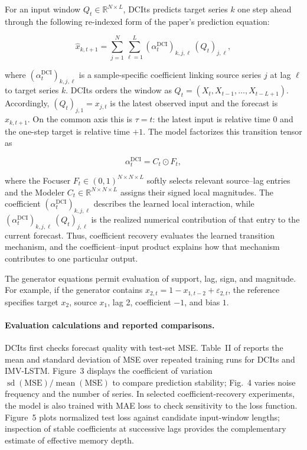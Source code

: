 For an input window $Q_t\in\mathbb{R}^{N\times L}$, DCIts predicts target series
$k$ one step ahead through the following re-indexed form of the paper's
prediction equation:

\begin{equation}
    \widehat{x}_{k,t+1}
    = \sum_{j=1}^{N}\sum_{\ell=1}^{L}
    (\alpha^{\mathrm{DCI}}_t)_{k,j,\ell}\,(Q_t)_{j,\ell},
\end{equation}

where $(\alpha^{\mathrm{DCI}}_t)_{k,j,\ell}$ is a sample-specific coefficient
linking source series $j$ at lag $\ell$ to target series $k$. DCIts orders the
window as $Q_t=(X_t,X_{t-1},\ldots,X_{t-L+1})$. Accordingly,
$(Q_t)_{j,1}=x_{j,t}$ is the latest observed input and the forecast is
$x_{k,t+1}$. On the common axis this is $\tau=t$: the latest input is relative
time 0 and the one-step target is relative time $+1$. The model factorizes
this transition tensor as

\begin{equation}
    \alpha^{\mathrm{DCI}}_t = C_t \odot F_t,
\end{equation}

where the Focuser $F_t\in(0,1)^{N\times N\times L}$ softly selects relevant
source--lag entries and the Modeler $C_t\in\mathbb{R}^{N\times N\times L}$
assigns their signed local magnitudes. The coefficient
$(\alpha^{\mathrm{DCI}}_t)_{k,j,\ell}$ describes the learned local interaction,
while $(\alpha^{\mathrm{DCI}}_t)_{k,j,\ell}\,(Q_t)_{j,\ell}$ is the realized
numerical contribution of that entry to the current forecast. Thus,
coefficient recovery evaluates the learned transition mechanism, and the
coefficient--input product explains how that mechanism contributes to one
particular output.

The generator equations permit evaluation of support, lag, sign, and magnitude.
For example, if the generator contains
$x_{2,t}=1-x_{1,t-2}+\varepsilon_{2,t}$, the reference specifies target
$x_2$, source $x_1$, lag 2, coefficient $-1$, and bias $1$.

\paragraph{Evaluation calculations and reported comparisons.}
DCIts first checks forecast quality with test-set MSE. Table~II of
\citet{baric2026dcits} reports the mean and standard deviation of MSE over
repeated training runs for DCIts and IMV-LSTM. Figure~3 displays the
coefficient of variation
$\operatorname{sd}(\mathrm{MSE})/\operatorname{mean}(\mathrm{MSE})$ to compare
prediction stability; Fig.~4 varies noise frequency and the number of series.
In selected coefficient-recovery experiments, the model is also trained with
MAE loss to check sensitivity to the loss function. Figure~5 plots normalized
test loss against candidate input-window lengths; inspection of stable
coefficients at successive lags provides the complementary estimate of
effective memory depth.

